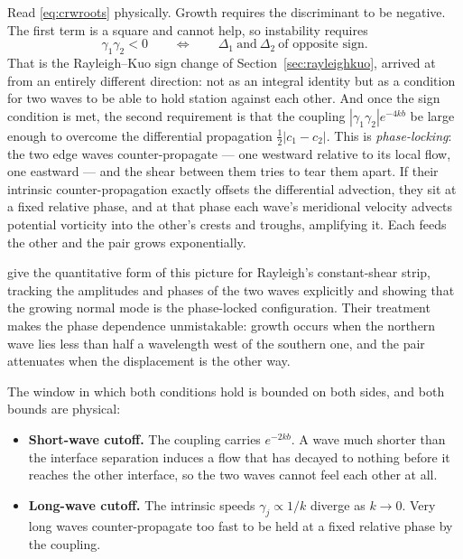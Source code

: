\documentclass[11pt,a4paper]{article}
\begin{document}
Read \eqref{eq:crwroots} physically. Growth requires the discriminant to be
negative. The first term is a square and cannot help, so instability requires
%
\begin{equation}
\gamma_1\gamma_2 < 0
\qquad\Longleftrightarrow\qquad
\Delta_1 \ \text{and}\ \Delta_2 \ \text{of opposite sign} .
\label{eq:oppositesign}
\end{equation}
%
That is the Rayleigh--Kuo sign change of Section~\ref{sec:rayleighkuo}, arrived
at from an entirely different direction: not as an integral identity but as a
condition for two waves to be able to hold station against each other. And once
the sign condition is met, the second requirement is that the coupling
$|\gamma_1\gamma_2|e^{-4kb}$ be large enough to overcome the differential
propagation $\tfrac12|c_1 - c_2|$. This is \emph{phase-locking}: the two edge
waves counter-propagate --- one westward relative to its local flow, one eastward
--- and the shear between them tries to tear them apart. If their intrinsic
counter-propagation exactly offsets the differential advection, they sit at a
fixed relative phase, and at that phase each wave's meridional velocity advects
potential vorticity into the other's crests and troughs, amplifying it. Each
feeds the other and the pair grows exponentially.

\citet{heifetz1999} give the quantitative form of this picture for Rayleigh's
constant-shear strip, tracking the amplitudes and phases of the two waves
explicitly and showing that the growing normal mode is the phase-locked
configuration. Their treatment makes the phase dependence unmistakable: growth
occurs when the northern wave lies less than half a wavelength west of the
southern one, and the pair attenuates when the displacement is the other way.

The window in which both conditions hold is bounded on both sides, and both
bounds are physical:
%
\begin{itemize}
\item \textbf{Short-wave cutoff.} The coupling carries $e^{-2kb}$. A wave much
shorter than the interface separation induces a flow that has decayed to nothing
before it reaches the other interface, so the two waves cannot feel each other
at all.
\item \textbf{Long-wave cutoff.} The intrinsic speeds $\gamma_j \propto 1/k$
diverge as $k\to0$. Very long waves counter-propagate too fast to be held at a
fixed relative phase by the coupling.
\end{itemize}
\end{document}
